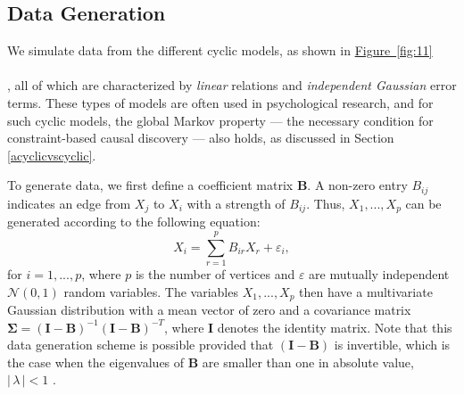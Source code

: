 \documentclass[twoside, 11pt]{article}
\newcommand*{\figref}[2][]{%
  \hyperref[{fig:#2}]{%
    Figure~\ref*{fig:#2}%
    \ifx\\#1\\%
    \else
      #1%
    \fi
  }%
}
\begin{document}

\subsection{Data Generation}
We simulate data from the different cyclic models, as shown in \figref[]{11}, all of which are characterized by \textit{linear} relations and \textit{independent Gaussian} error terms. These types of models are often used in psychological research, and for such cyclic models, the global Markov property --- the necessary condition for constraint-based causal discovery --- also holds, as discussed in Section \ref{acyclicvscyclic}.

To generate data, we first define a coefficient matrix $\mathbf{B}$. A non-zero entry $B_{ij}$ indicates an edge from $X_j$ to $X_i$ with a strength of $B_{ij}$. Thus, $X_1, ... , X_p$ can be generated according to the following equation:
$$X_i = \sum_{r=1}^{p}B_{ir}X_r + \varepsilon_i,$$
for $i = 1, ..., p$, where $p$ is the number of vertices and $\varepsilon$ are mutually independent $\mathcal{N}(0,1)$ random variables.
The variables $X_1, ..., X_p$ then have a multivariate Gaussian distribution with a mean vector of zero and a covariance matrix $\mathbf{\Sigma} = (\mathbf{I} - \mathbf{B})^{-1} (\mathbf{I} - \mathbf{B})^{-T}$, where $\mathbf{I}$ denotes the identity matrix.
Note that this data generation scheme is possible provided that $(\mathbf{I} - \mathbf{B})$ is invertible, which is the case when the eigenvalues of $\mathbf{B}$ are smaller than one in absolute value, $|\,\lambda\,| < 1$ \citep{eberhardt2010}. 
\end{document}
